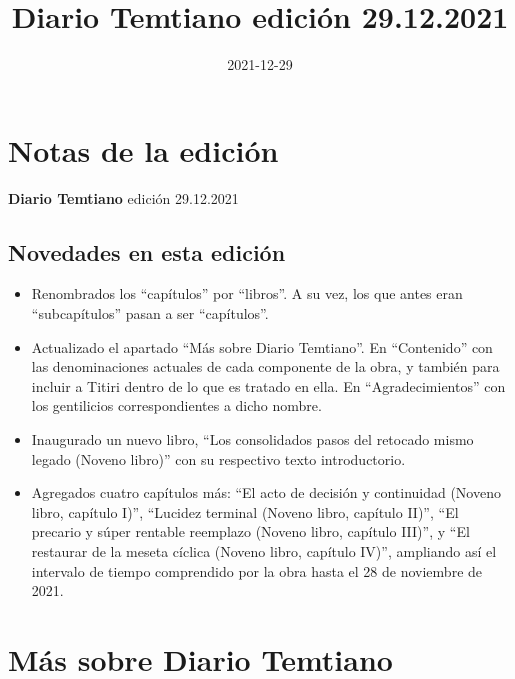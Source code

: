 \documentclass[
  spanish,
]{book}
\title{Diario Temtiano edición 29.12.2021}
\author{}
\date{\vspace{-2.5em}2021-12-29}
\begin{document}
\maketitle

{
\setcounter{tocdepth}{1}
\tableofcontents
}
\hypertarget{notas-de-la-ediciuxf3n}{%
\chapter*{Notas de la edición}\label{notas-de-la-ediciuxf3n}}

\textbf{Diario Temtiano} edición 29.12.2021

\hypertarget{novedades-en-esta-ediciuxf3n}{%
\section*{Novedades en esta edición}\label{novedades-en-esta-ediciuxf3n}}

\begin{itemize}
\item
  Renombrados los ``capítulos'' por ``libros''. A su vez, los que antes eran ``subcapítulos'' pasan a ser ``capítulos''.
\item
  Actualizado el apartado ``Más sobre Diario Temtiano''. En ``Contenido'' con las denominaciones actuales de cada componente de la obra, y también para incluir a Titiri dentro de lo que es tratado en ella. En ``Agradecimientos'' con los gentilicios correspondientes a dicho nombre.
\item
  Inaugurado un nuevo libro, ``Los consolidados pasos del retocado mismo legado (Noveno libro)'' con su respectivo texto introductorio.
\item
  Agregados cuatro capítulos más: ``El acto de decisión y continuidad (Noveno libro, capítulo I)'', ``Lucidez terminal (Noveno libro, capítulo II)'', ``El precario y súper rentable reemplazo (Noveno libro, capítulo III)'', y ``El restaurar de la meseta cíclica (Noveno libro, capítulo IV)'', ampliando así el intervalo de tiempo comprendido por la obra hasta el 28 de noviembre de 2021.
\end{itemize}

\hypertarget{muxe1s-sobre-diario-temtiano}{%
\chapter*{Más sobre Diario Temtiano}\label{muxe1s-sobre-diario-temtiano}}
\end{document}
